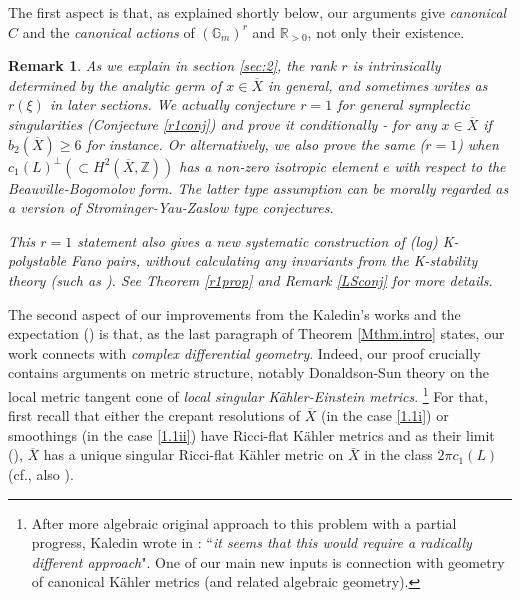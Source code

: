 \documentclass[12pt,a4paper]{amsart}
\newtheorem{Rem}[Thm]{Remark}
\theoremstyle{remark}
\theoremstyle{definition}
\def\R{\mathbb{R}}
\def\G{\mathbb{G}}
\def\Z{\mathbb{Z}}
\begin{document}
The first aspect is that, 
as explained shortly below, our arguments give {\it canonical}  
$C$ and the {\it canonical actions} of 
$(\G_m)^r$ and $\R_{>0}$, not only their existence. 
\begin{Rem}
As we explain in section \ref{sec:2}, 
the rank $r$ is intrinsically determined by the analytic 
germ of $x\in \overline{X}$ in general, and 
sometimes writes as $r(\xi)$ in later sections. 
We actually conjecture $r=1$ for general 
symplectic singularities (Conjecture \ref{r1conj}) and 
prove it conditionally - for any $x\in \overline{X}$ 
if $b_2(\overline{X})\ge 6$ for instance. Or alternatively, we also prove 
the same ($r=1$) when $c_1(L)^{\perp}(\subset H^2(\overline{X},\Z))$ 
has a non-zero isotropic element $e$ with respect to the 
Beauville-Bogomolov form. The latter type assumption can be morally 
regarded as a 
version of Strominger-Yau-Zaslow type conjectures. 

This $r=1$ statement also gives a new systematic construction of 
(log) K-polystable Fano pairs, without calculating any invariants 
from the K-stability theory (such as 
\cite{FO,BlJ}). 
See Theorem \ref{r1prop} and Remark \ref{LSconj} 
for more details. 
\end{Rem}

The second aspect of our improvements from the Kaledin's works 
and the expectation 
(\cite{Kaledin, Kaledin 2})
is that, 
as the last paragraph of Theorem \ref{Mthm.intro} states, our work 
connects with {\it complex differential geometry}. 
Indeed, our proof crucially contains arguments on metric structure, notably 
Donaldson-Sun theory \cite{DSII} 
on the local metric tangent cone of {\it local 
singular K\"ahler-Einstein metrics}.
\footnote{After more algebraic original approach 
to this problem with a partial progress, 
Kaledin wrote in  \cite[Remark 4.2]{Kaledin}: ``{\it it  seems that this would require a radically different approach}". One of our main new inputs is connection 
with geometry of canonical K\"ahler metrics (and related algebraic geometry).} 
For that, first recall that either the crepant 
resolutions of $\overline{X}$ (in the case \eqref{1.1i}) 
or smoothings (in the case \eqref{1.1ii}) 
have 
Ricci-flat K\"ahler metrics \cite{Yau} and as their 
limit (\cite{RZ, DS, JianSong}), $\overline{X}$ 
has a unique singular Ricci-flat K\"ahler metric on 
$\bar{X}$ in the class $2\pi c_1(L)$ (cf., also 
\cite{EGZ}). 
\end{document}
